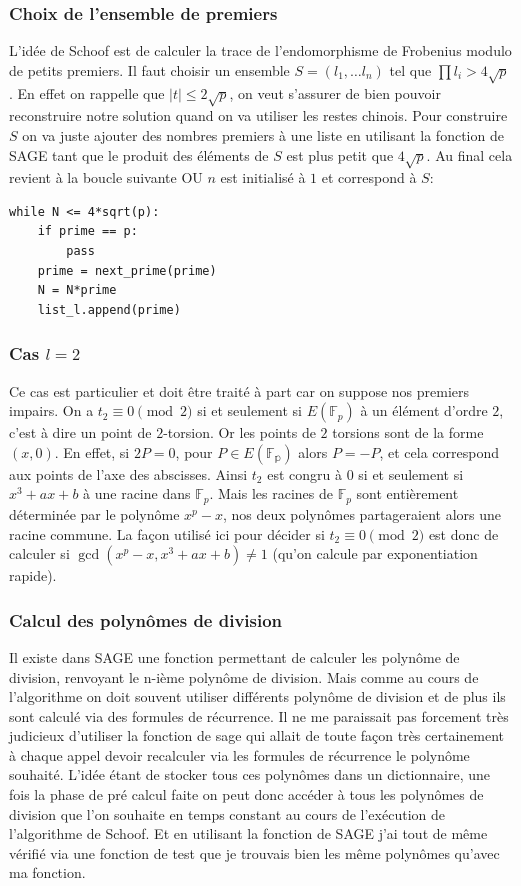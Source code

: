 \documentclass{article}
\begin{document}
\subsubsection{Choix de l'ensemble de premiers}
L'idée de Schoof est de calculer la trace de l'endomorphisme de Frobenius modulo de petits premiers. Il faut choisir un ensemble $S = (l_1, \ldots l_n)$ tel que $\prod l_i > 4\sqrt{p}$. En effet on rappelle que  $|t| \leq 2 \sqrt{p}$, on veut s'assurer de bien pouvoir reconstruire notre solution quand on va utiliser les restes chinois. Pour construire $S$ on va juste ajouter des nombres premiers à une liste en utilisant la fonction  de SAGE tant que le produit des éléments de $S$ est plus petit que $ 4\sqrt{p}$. Au final cela revient à la boucle suivante OU $n$ est initialisé à $1$ et  correspond à $S$:
\bigskip

\begin{lstlisting}
while N <= 4*sqrt(p):
	if prime == p:
		pass
	prime = next_prime(prime)
	N = N*prime
	list_l.append(prime)
\end{lstlisting}


\subsubsection{Cas $l=2$}
Ce cas est particulier et doit être traité à part car on suppose nos premiers impairs. On a $t_2 \equiv 0 \pmod 2$ si et seulement si $E(\mathbb{F}_p)$ à un élément d'ordre $2$, c'est à dire un point de $2$-torsion. Or les points de $2$ torsions sont de la forme $(x, 0)$. En effet, si $2P = 0$, pour $P \in E(\mathbb{F_p})$ alors $P = -P$, et cela correspond aux points de l'axe des abscisses. Ainsi $t_2$ est congru à $0$ si et seulement si $x^3 +ax +b$ à une racine dans $\mathbb{F}_p$. Mais les racines de $\mathbb{F}_p$ sont entièrement déterminée par le polynôme $x^p - x$, nos deux polynômes partageraient alors une racine commune. La façon utilisé ici pour décider si $t_2 \equiv 0 \pmod 2$ est donc de calculer si $\gcd(x^p - x, x^3 +ax +b) \ne 1$ (qu'on calcule par exponentiation rapide).

\subsubsection{Calcul des polynômes de division}
Il existe dans SAGE une fonction permettant de calculer les polynôme de division,  renvoyant le n-ième polynôme de division. Mais comme au cours de l'algorithme on doit souvent utiliser différents polynôme de division et de plus ils sont calculé via des formules de récurrence. Il ne me paraissait pas forcement très judicieux d'utiliser la fonction de sage qui allait de toute façon très certainement à chaque appel devoir recalculer via les formules de récurrence le polynôme souhaité. L'idée étant de stocker tous ces polynômes dans un dictionnaire, une fois la phase de pré calcul faite on peut donc accéder à tous les polynômes de division que l'on souhaite en temps constant au cours de l'exécution de l'algorithme de Schoof. Et en utilisant la fonction de SAGE j'ai tout de même vérifié via une fonction de test que je trouvais bien les même polynômes qu'avec ma fonction.
\end{document}
